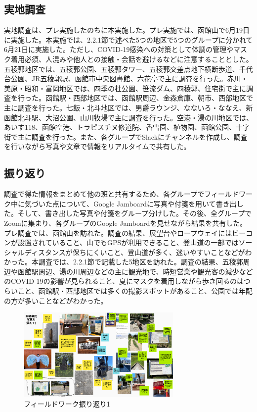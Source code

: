 
\subsection{実地調査}
実地調査は、プレ実施したのちに本実施した。プレ実施では、函館山で6月19日に実施した。本実施では、2.2.1節で述べた5つの地区で5つのグループに分かれて6月21日に実施した。ただし、COVID-19感染への対策として体調の管理やマスク着用必須、人混みや他人との接触・会話を避けるなどに注意することとした。五稜郭地区では、五稜郭公園、五稜郭タワー、五稜郭交差点地下横断歩道、千代台公園、JR五稜郭駅、函館市中央図書館、六花亭で主に調査を行った。赤川・美原・昭和・富岡地区では、四季の杜公園、笹流ダム、四稜郭、住宅街で主に調査を行った。函館駅・西部地区では、函館駅周辺、金森倉庫、朝市、西部地区で主に調査を行った。七飯・北斗地区では、男爵ラウンジ、なないろ・ななえ、新函館北斗駅、大沼公園、山川牧場で主に調査を行った。空港・湯の川地区では、あいす118、函館空港、トラピスチヌ修道院、香雪園、植物園、函館公園、十字街で主に調査を行った。また、各グループでSlackにチャンネルを作成し、調査を行いながら写真や文章で情報をリアルタイムで共有した。


\subsection{振り返り}
調査で得た情報をまとめて他の班と共有するため、各グループでフィールドワーク中に気づいた点について、Google Jamboardに写真や付箋を用いて書き出した。そして、書き出した写真や付箋をグループ分けした。その後、全グループでZoomに集まり、各グループのGoogle Jamboardを見せながら結果を共有した。プレ調査では、函館山を訪れた。調査の結果、展望台やロープウェイにはビーコンが設置されていること、山でもGPSが利用できること、登山道の一部ではソーシャルディスタンスが保ちにくいこと、登山道が多く、迷いやすいことなどがわかった。本調査では、2.2.1節で記載した5地区を訪れた。調査の結果、五稜郭周辺や函館駅周辺、湯の川周辺などの主に観光地で、時短営業や観光客の減少などのCOVID-19の影響が見られること、夏にマスクを着用しながら歩き回るのはつらいこと、函館駅・西部地区では多くの撮影スポットがあること、公園では年配の方が多いことなどがわかった。


\begin{figure}[htbp]
    \begin{center}
    \includegraphics[width=8cm]{images/FW1.png}
    \end{center}
    \caption{フィールドワーク振り返り1}
    \label{fig:furikaeri1}
\end{figure}

